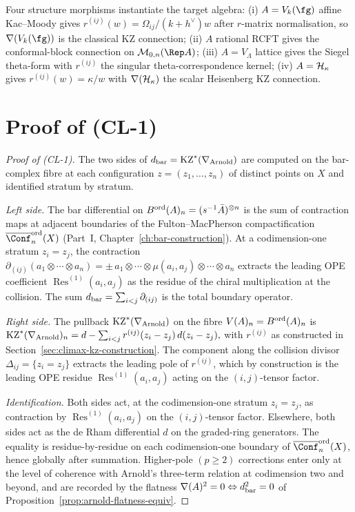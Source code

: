 Four structure morphisms instantiate the target algebra:
\textup{(i)} \(A = V_{k}(\fg)\) affine Kac--Moody gives
\(r^{(ij)}(w) = \Omega_{ij}/(k+h^{\vee}) w\) after \(r\)-matrix
normalisation, so \(\nabla(V_{k}(\fg))\) is the classical KZ connection;
\textup{(ii)} \(A\) rational RCFT gives the conformal-block connection
on \(\mathcal{M}_{0,n}(\Rep A)\); \textup{(iii)} \(A = V_{\Lambda}\)
lattice gives the Siegel theta-form with \(r^{(ij)}\) the singular
theta-correspondence kernel; \textup{(iv)} \(A = \mathcal{H}_{\kappa}\) gives
\(r^{(ij)}(w) = \kappa/w\) with \(\nabla(\mathcal{H}_{\kappa})\) the scalar
Heisenberg KZ connection.

\section{Proof of (CL-1)}
\label{sec:climax-cl1-proof}

\begin{proof}[Proof of \textup{(CL-1)}]
The two sides of \(d_{\mathrm{bar}} = \mathrm{KZ}^{*}(\nabla_{\mathrm{Arnold}})\) are computed on the
bar-complex fibre at each configuration \(z = (z_{1}, \ldots, z_{n})\)
of distinct points on \(X\) and identified stratum by stratum.

\smallskip
\emph{Left side.} The bar differential on
\(B^{\mathrm{ord}}(A)_{n} = (s^{-1}\bar A)^{\otimes n}\) is the sum of contraction
maps at adjacent boundaries of the Fulton--MacPherson compactification
\(\overline{\Conf}_{n}^{\mathrm{ord}}(X)\) (Part~I,
Chapter~\ref{ch:bar-construction}). At a codimension-one stratum
\(z_{i} = z_{j}\), the contraction
\(
  \partial_{(ij)}(a_{1} \otimes \cdots \otimes a_{n})
  = \pm\, a_{1} \otimes \cdots \otimes \mu(a_{i}, a_{j}) \otimes \cdots \otimes a_{n}
\)
extracts the leading OPE coefficient \(\operatorname{Res}^{(1)}(a_{i}, a_{j})\)
as the residue of the chiral multiplication at the collision. The sum
\(d_{\mathrm{bar}} = \sum_{i<j}\partial_{(ij)}\) is the total boundary operator.

\smallskip
\emph{Right side.} The pullback \(\mathrm{KZ}^{*}(\nabla_{\mathrm{Arnold}})\) on the fibre
\(V(A)_{n} = B^{\mathrm{ord}}(A)_{n}\) is
\(
  \mathrm{KZ}^{*}(\nabla_{\mathrm{Arnold}})_{n} = d - \sum_{i<j} r^{(ij)}(z_{i}-z_{j})\, d(z_{i}-z_{j}),
\)
with \(r^{(ij)}\) as constructed in Section~\ref{sec:climax-kz-construction}.
The component along the collision divisor \(\Delta_{ij} = \{z_{i} = z_{j}\}\)
extracts the leading pole of \(r^{(ij)}\), which by construction is the
leading OPE residue \(\operatorname{Res}^{(1)}(a_{i}, a_{j})\) acting
on the \((i,j)\)-tensor factor.

\smallskip
\emph{Identification.} Both sides act, at the codimension-one stratum
\(z_{i} = z_{j}\), as contraction by \(\operatorname{Res}^{(1)}(a_{i}, a_{j})\)
on the \((i,j)\)-tensor factor. Elsewhere, both sides act as the de Rham
differential \(d\) on the graded-ring generators. The equality is
residue-by-residue on each codimension-one boundary of
\(\overline{\Conf}_{n}^{\mathrm{ord}}(X)\), hence globally after
summation. Higher-pole \((p \geq 2)\) corrections enter only at the
level of coherence with Arnold's three-term relation at codimension
two and beyond, and are recorded by the flatness
\(\nabla(A)^{2} = 0 \Leftrightarrow d_{\mathrm{bar}}^{2} = 0\) of
Proposition~\ref{prop:arnold-flatness-equiv}.
\end{proof}

